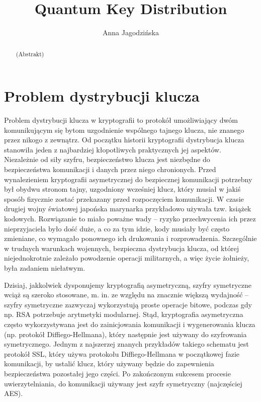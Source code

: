 \documentclass[10pt]{article}
\begin{document}
\begin{opening}

\title{Quantum Key Distribution}
\author[AGH University of Science and Technology, anna.jagodzinska91@gmail.com]{Anna Jagodzińska}

\begin{abstract}
  (Abstrakt)
\end{abstract}


\end{opening}

\section{Problem dystrybucji klucza}

Problem dystrybucji klucza w kryptografii to protokół umożliwiający dwóm komunikującym się bytom
uzgodnienie wspólnego tajnego klucza, nie znanego przez nikogo z zewnątrz. Od początku historii
kryptografii dystrybucja klucza stanowiła jeden z najbardziej kłopotliwych praktycznych jej aspektów.
Niezależnie od siły szyfru, bezpieczeństwo klucza jest niezbędne do bezpieczeństwa komunikacji i danych
przez niego chronionych. Przed wynalezieniem kryptografii asymetrycznej do bezpiecznej komunikacji 
potrzebny był obydwu stronom tajny, uzgodniony wcześniej klucz, który musiał w jakiś sposób fizycznie 
zostać przekazany przed rozpoczęciem komunikacji. W czasie drugiej wojny światowej japońska marynarka
przykładowo używała tzw. książek kodowych. Rozwiązanie to miało poważne wady -- ryzyko przechwycenia
ich przez nieprzyjaciela było dość duże, a co za tym idzie, kody musiały być często zmieniane, co 
wymagało ponownego ich drukowania i rozprowadzenia. Szczególnie w trudnych warunkach wojennych,
bezpieczna dystrybucja klucza, od której niejednokrotnie zależało powodzenie operacji militarnych,
a więc życie żołnieży, była zadaniem niełatwym. 

Dzisiaj, jakkolwiek dysponujemy kryptografią asymetryczną, szyfry symetryczne wciąż są szeroko 
stosowane, m. in. ze względu na znacznie większą wydajność\cite{IntelAES, IntelSSL} -- szyfry 
symetryczne zazwyczaj wykorzystują proste operacje bitowe, podczas gdy np. RSA potrzebuje arytmetyki
modularnej\footnotemark. Stąd, kryptografia asymetryczna często wykorzystywana jest do zainicjowania
komunikacji i wygenerowania klucza (np. protokół Diffiego-Hellmana), który następnie jest używany do
szyfrowania symetrycznego. Jednym z najszerzej znanych przykładów takiego schematu jest protokół
SSL, który używa protokołu Diffiego-Hellmana w początkowej fazie komunikacji, by ustalić klucz,
który używany będzie do zapewnienia bezpieczeństwa pozostałej jego części. Po zakończonym sukcesem
procesie uwierzytelniania, do komunikacji używany jest szyfr symetryczny (najczęściej AES).
\end{document}
